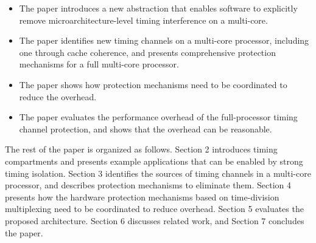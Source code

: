 \begin{itemize}
\item The paper introduces a new abstraction that enables software to
explicitly remove microarchitecture-level timing interference on a multi-core.
\item The paper identifies new timing channels on a multi-core processor,
including one through cache coherence, and presents
comprehensive protection mechanisms for a full multi-core processor.
\item The paper shows how protection mechanisms need to be coordinated to
reduce the overhead.%
\item The paper evaluates the performance overhead of the full-processor
timing channel protection, and shows that the overhead can be reasonable.
\end{itemize}

The rest of the paper is organized as follows.
Section 2 introduces timing compartments and 
presents example applications that can be enabled by strong timing isolation.
Section 3 identifies the sources of timing channels in a multi-core processor, and
describes protection mechanisms to eliminate them. 
Section 4 presents how the hardware protection mechanisms based on time-division
multiplexing need to be coordinated to reduce overhead.
Section 5 evaluates the proposed architecture. Section 6 discusses related
work, and Section 7 concludes the paper.
